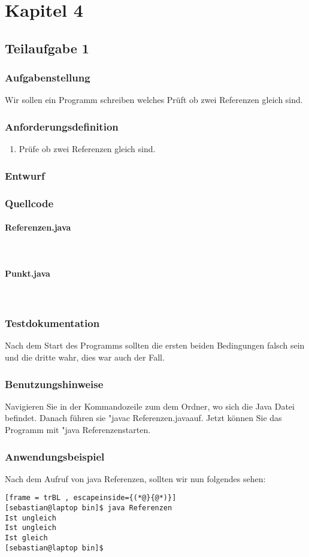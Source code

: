 \section{Kapitel 4}
\subsection{Teilaufgabe 1}
\subsubsection{Aufgabenstellung}
Wir sollen ein Programm schreiben welches Prüft ob zwei Referenzen gleich sind.

\subsubsection{Anforderungsdefinition}
\begin{enumerate}
	\item Prüfe ob zwei Referenzen gleich sind.
\end{enumerate}

\subsubsection{Entwurf}


\subsubsection{Quellcode}
\paragraph{Referenzen.java}\

\paragraph{Punkt.java}\


\subsubsection{Testdokumentation}
Nach dem Start des Programms sollten die ersten beiden Bedingungen falsch sein und die dritte wahr, dies war auch der Fall.

\subsubsection{Benutzungshinweise}
Navigieren Sie in der Kommandozeile zum dem Ordner, wo sich die Java Datei befindet.
Danach führen sie "javac Referenzen.java\dq \space auf. Jetzt können Sie das Programm mit
"java Referenzen\dq \space starten.

\subsubsection{Anwendungsbeispiel}
Nach dem Aufruf von java Referenzen, sollten wir nun folgendes sehen:
\begin{lstlisting}[frame = trBL , escapeinside={(*@}{@*)}]
[sebastian@laptop bin]$ java Referenzen 
Ist ungleich
Ist ungleich
Ist gleich
[sebastian@laptop bin]$  
\end{lstlisting}
